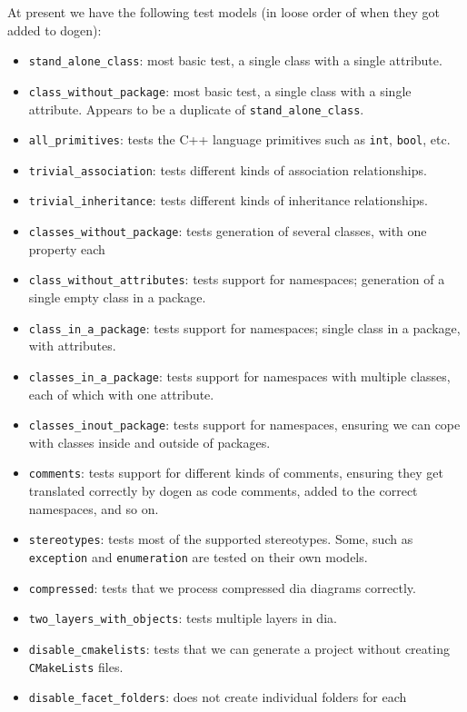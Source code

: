 \documentclass[11pt]{article}
\begin{document}
At present we have the following test models (in loose order of when
they got added to dogen):

\begin{itemize}
\item \texttt{stand\_alone\_class}: most basic test, a single class with a single
attribute.
\item \texttt{class\_without\_package}: most basic test, a single class with a
single attribute. Appears to be a duplicate of \texttt{stand\_alone\_class}.
\item \texttt{all\_primitives}: tests the C++ language primitives such as \texttt{int},
\texttt{bool}, etc.
\item \texttt{trivial\_association}: tests different kinds of association
relationships.
\item \texttt{trivial\_inheritance}: tests different kinds of inheritance
relationships.
\item \texttt{classes\_without\_package}: tests generation of several classes, with
one property each
\item \texttt{class\_without\_attributes}: tests support for namespaces; generation
of a single empty class in a package.
\item \texttt{class\_in\_a\_package}: tests support for namespaces; single class in
a package, with attributes.
\item \texttt{classes\_in\_a\_package}: tests support for namespaces with multiple
classes, each of which with one attribute.
\item \texttt{classes\_inout\_package}: tests support for namespaces, ensuring we
can cope with classes inside and outside of packages.
\item \texttt{comments}: tests support for different kinds of comments, ensuring
they get translated correctly by dogen as code comments, added to
the correct namespaces, and so on.
\item \texttt{stereotypes}: tests most of the supported stereotypes. Some, such
as \texttt{exception} and \texttt{enumeration} are tested on their own models.
\item \texttt{compressed}: tests that we process compressed dia diagrams
correctly.
\item \texttt{two\_layers\_with\_objects}: tests multiple layers in dia.
\item \texttt{disable\_cmakelists}: tests that we can generate a project without
creating \texttt{CMakeLists} files.
\item \texttt{disable\_facet\_folders}: does not create individual folders for each

\end{itemize}
\end{document}
